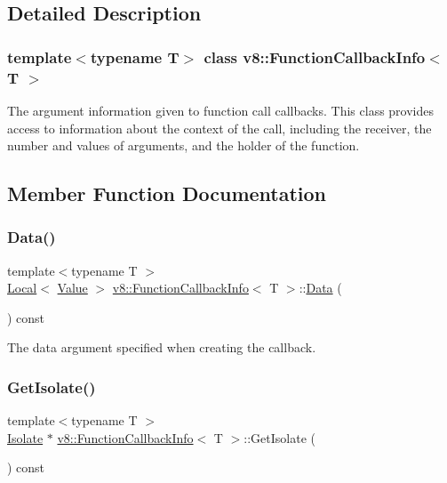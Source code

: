 \subsection{Detailed Description}
\subsubsection*{template$<$typename T$>$\newline
class v8\+::\+Function\+Callback\+Info$<$ T $>$}

The argument information given to function call callbacks. This class provides access to information about the context of the call, including the receiver, the number and values of arguments, and the holder of the function. 

\subsection{Member Function Documentation}
\mbox{\label{classv8_1_1FunctionCallbackInfo_ab0ebfc2ea43af2fdfc3d085272bf499f}} 
\subsubsection{\texorpdfstring{Data()}{Data()}}
{\footnotesize\ttfamily template$<$typename T $>$ \\
\mbox{\hyperlink{classv8_1_1Local}{Local}}$<$ \mbox{\hyperlink{classv8_1_1Value}{Value}} $>$ \mbox{\hyperlink{classv8_1_1FunctionCallbackInfo}{v8\+::\+Function\+Callback\+Info}}$<$ T $>$\+::\mbox{\hyperlink{classv8_1_1Data}{Data}} (\begin{DoxyParamCaption}{ }\end{DoxyParamCaption}) const}

The data argument specified when creating the callback. \mbox{\label{classv8_1_1FunctionCallbackInfo_a7eee713a6f95d5707ce788861754682f}} 
\subsubsection{\texorpdfstring{Get\+Isolate()}{GetIsolate()}}
{\footnotesize\ttfamily template$<$typename T $>$ \\
\mbox{\hyperlink{classv8_1_1Isolate}{Isolate}} $\ast$ \mbox{\hyperlink{classv8_1_1FunctionCallbackInfo}{v8\+::\+Function\+Callback\+Info}}$<$ T $>$\+::Get\+Isolate (\begin{DoxyParamCaption}{ }\end{DoxyParamCaption}) const}

